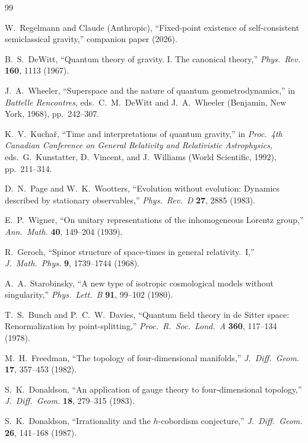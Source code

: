 \documentclass[12pt,a4paper]{article}
\theoremstyle{definition}
\theoremstyle{remark}
\begin{document}
\begin{thebibliography}{99}

W.~Regelmann and Claude (Anthropic),
``Fixed-point existence of self-consistent semiclassical gravity,''
companion paper (2026).

B.~S.~DeWitt,
``Quantum theory of gravity. I. The canonical theory,''
\textit{Phys.\ Rev.} \textbf{160}, 1113 (1967).

J.~A.~Wheeler,
``Superspace and the nature of quantum geometrodynamics,''
in \textit{Battelle Rencontres}, eds.\ C.~M.~DeWitt and J.~A.~Wheeler
(Benjamin, New York, 1968), pp.~242--307.

K.~V.~Kucha\v{r},
``Time and interpretations of quantum gravity,''
in \textit{Proc.\ 4th Canadian Conference on General Relativity and
Relativistic Astrophysics}, eds.\ G.~Kunstatter, D.~Vincent, and
J.~Williams (World Scientific, 1992), pp.~211--314.

D.~N.~Page and W.~K.~Wootters,
``Evolution without evolution: Dynamics described by stationary observables,''
\textit{Phys.\ Rev.\ D} \textbf{27}, 2885 (1983).

E.~P.~Wigner,
``On unitary representations of the inhomogeneous Lorentz group,''
\textit{Ann.\ Math.} \textbf{40}, 149--204 (1939).

R.~Geroch,
``Spinor structure of space-times in general relativity.\ I,''
\textit{J.\ Math.\ Phys.} \textbf{9}, 1739--1744 (1968).

A.~A.~Starobinsky,
``A new type of isotropic cosmological models without singularity,''
\textit{Phys.\ Lett.\ B} \textbf{91}, 99--102 (1980).

T.~S.~Bunch and P.~C.~W.~Davies,
``Quantum field theory in de Sitter space: Renormalization by point-splitting,''
\textit{Proc.\ R.\ Soc.\ Lond.\ A} \textbf{360}, 117--134 (1978).

M.~H.~Freedman,
``The topology of four-dimensional manifolds,''
\textit{J.\ Diff.\ Geom.} \textbf{17}, 357--453 (1982).

S.~K.~Donaldson,
``An application of gauge theory to four-dimensional topology,''
\textit{J.\ Diff.\ Geom.} \textbf{18}, 279--315 (1983).

S.~K.~Donaldson,
``Irrationality and the $h$-cobordism conjecture,''
\textit{J.\ Diff.\ Geom.} \textbf{26}, 141--168 (1987).


\end{thebibliography}
\end{document}

